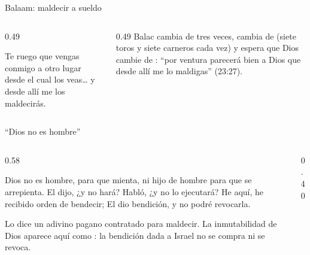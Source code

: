 \begin{frame}{Balaam: maldecir a sueldo}
\centering
{}\par\medskip
\begin{columns}[t,onlytextwidth]
\begin{column}{0.49\textwidth}
\begin{cita}Te ruego que vengas conmigo a otro lugar desde el cual los veas\ldots{} y desde allí me los maldecirás.\end{cita}
\end{column}
\begin{column}{0.49\textwidth}\small
Balac cambia de  tres veces, cambia de  (siete toros y siete carneros cada vez) y espera que Dios cambie de : ``por ventura parecerá bien a Dios que desde allí me lo maldigas'' (23:27).
\end{column}
\end{columns}
\end{frame}

\begin{frame}{``Dios no es hombre''}
\begin{columns}[c,onlytextwidth]
\begin{column}{0.58\textwidth}
\begin{cita}Dios no es hombre, para que mienta, ni hijo de hombre para que se arrepienta. El dijo, ¿y no hará? Habló, ¿y no lo ejecutará? He aquí, he recibido orden de bendecir; El dio bendición, y no podré revocarla.\end{cita}
\small Lo dice un adivino pagano contratado para maldecir. La inmutabilidad de Dios aparece aquí como : la bendición dada a Israel no se compra ni se revoca.
\end{column}
\begin{column}{0.40\textwidth}\end{column}
\end{columns}
\end{frame}

